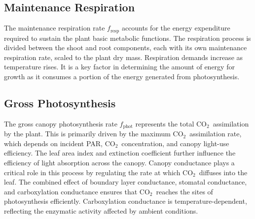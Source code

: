 \documentclass[conference]{IEEEtran}
\newcommand{\ui}[2]{#1_{\mathrm{#2}}}
\newcommand{\coo}{\ensuremath{\mathrm{CO_2}}}
\begin{document}
\subsection{Maintenance Respiration} The maintenance respiration rate \( \ui{f}{resp} \) accounts for the energy expenditure required to sustain the plant basic metabolic functions. The respiration process is divided between the shoot and root components, each with its own maintenance respiration rate, scaled to the plant dry mass. Respiration demands increase as temperature rises. It is a key factor in determining the amount of energy for growth as it consumes a portion of the energy generated from photosynthesis.

\subsection{Gross Photosynthesis} The gross canopy photosynthesis rate \( \ui{f}{phot} \) represents the total \coo\ assimilation by the plant. This is primarily driven by the maximum \coo\ assimilation rate, which depends on incident PAR, \coo\ concentration, and canopy light-use efficiency. The leaf area index and extinction coefficient further influence the efficiency of light absorption across the canopy. Canopy conductance plays a critical role in this process by regulating the rate at which \coo\ diffuses into the leaf. The combined effect of boundary layer conductance, stomatal conductance, and carboxylation conductance ensures that \coo\ reaches the sites of photosynthesis efficiently. Carboxylation conductance is temperature-dependent, reflecting the enzymatic activity affected by ambient conditions.
%



\end{document}
